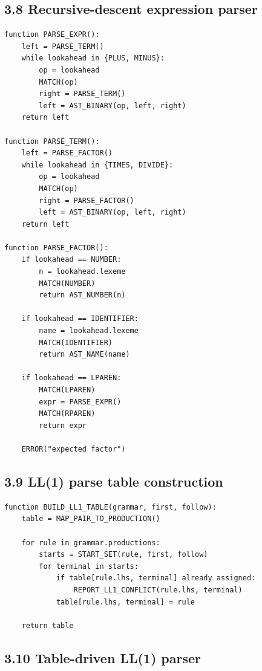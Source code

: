 \documentclass[10pt,letterpaper]{article}
\begin{document}
\subsection*{3.8 Recursive-descent expression parser}
{}

\begin{verbatim}
function PARSE_EXPR():
    left = PARSE_TERM()
    while lookahead in {PLUS, MINUS}:
        op = lookahead
        MATCH(op)
        right = PARSE_TERM()
        left = AST_BINARY(op, left, right)
    return left

function PARSE_TERM():
    left = PARSE_FACTOR()
    while lookahead in {TIMES, DIVIDE}:
        op = lookahead
        MATCH(op)
        right = PARSE_FACTOR()
        left = AST_BINARY(op, left, right)
    return left

function PARSE_FACTOR():
    if lookahead == NUMBER:
        n = lookahead.lexeme
        MATCH(NUMBER)
        return AST_NUMBER(n)

    if lookahead == IDENTIFIER:
        name = lookahead.lexeme
        MATCH(IDENTIFIER)
        return AST_NAME(name)

    if lookahead == LPAREN:
        MATCH(LPAREN)
        expr = PARSE_EXPR()
        MATCH(RPAREN)
        return expr

    ERROR("expected factor")
\end{verbatim}

\subsection*{3.9 LL(1) parse table construction}
{}

\begin{verbatim}
function BUILD_LL1_TABLE(grammar, first, follow):
    table = MAP_PAIR_TO_PRODUCTION()

    for rule in grammar.productions:
        starts = START_SET(rule, first, follow)
        for terminal in starts:
            if table[rule.lhs, terminal] already assigned:
                REPORT_LL1_CONFLICT(rule.lhs, terminal)
            table[rule.lhs, terminal] = rule

    return table
\end{verbatim}

\subsection*{3.10 Table-driven LL(1) parser}
{}
\end{document}

